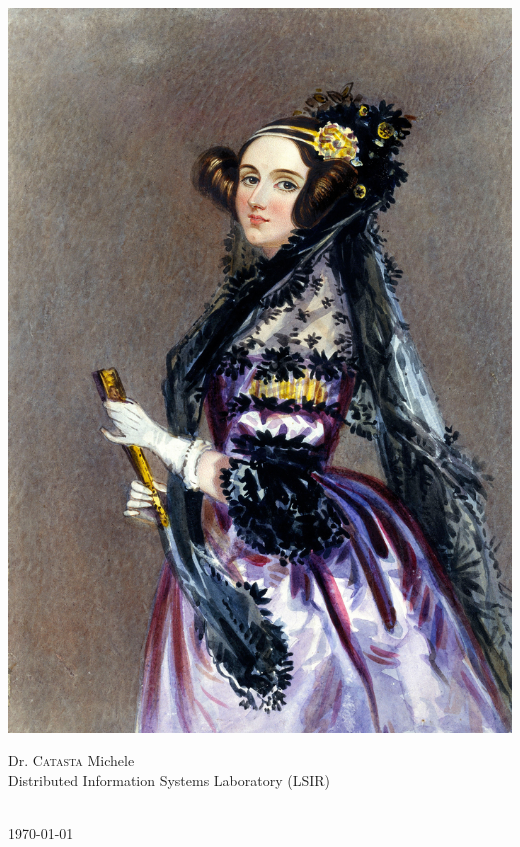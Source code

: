 \begin{titlepage}
\begin{center}
\begin{center}
\includegraphics[width = 5 cm]{img/00/lovelace} %
\end{center}



\begin{bottompar}
\begin{flushleft} \large
Dr. \textsc{Catasta} Michele\\
Distributed Information Systems Laboratory (LSIR) \\
 \\ 
\end{flushleft}

{\large \mydateformat\today} \\[1cm]

\end{bottompar}
 
\vfill %

\end{center}
\end{titlepage}

\clearpage
